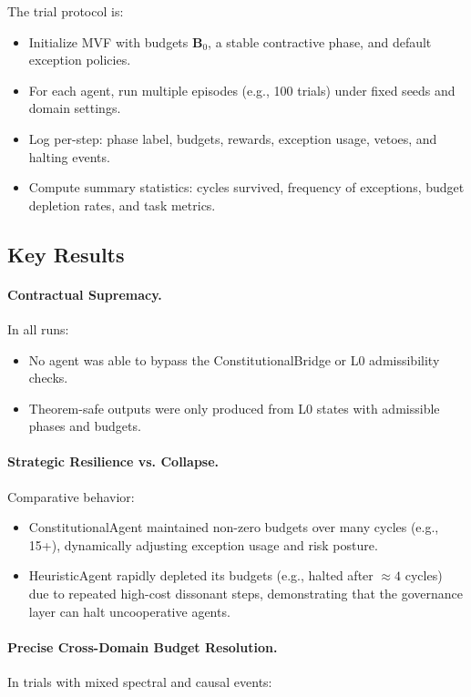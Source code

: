 \documentclass[11pt]{article}
\begin{document}
The trial protocol is:

\begin{itemize}[itemsep=2pt]
  \item Initialize MVF with budgets \(\mathbf{B}_0\), a stable contractive phase, and default exception policies.
  \item For each agent, run multiple episodes (e.g., 100 trials) under fixed seeds and domain settings.
  \item Log per-step: phase label, budgets, rewards, exception usage, vetoes, and halting events.
  \item Compute summary statistics: cycles survived, frequency of exceptions, budget depletion rates, and task metrics.
\end{itemize}

\subsection{Key Results}

\paragraph{Contractual Supremacy.}
In all runs:

\begin{itemize}[itemsep=2pt]
  \item No agent was able to bypass the ConstitutionalBridge or L0 admissibility checks.
  \item Theorem-safe outputs were only produced from L0 states with admissible phases and budgets.
\end{itemize}

\paragraph{Strategic Resilience vs. Collapse.}
Comparative behavior:

\begin{itemize}[itemsep=2pt]
  \item ConstitutionalAgent maintained non-zero budgets over many cycles (e.g., 15+), dynamically adjusting exception usage and risk posture.
  \item HeuristicAgent rapidly depleted its budgets (e.g., halted after \(\approx 4\) cycles) due to repeated high-cost dissonant steps, demonstrating that the governance layer can halt uncooperative agents.
\end{itemize}

\paragraph{Precise Cross-Domain Budget Resolution.}
In trials with mixed spectral and causal events:
\end{document}
